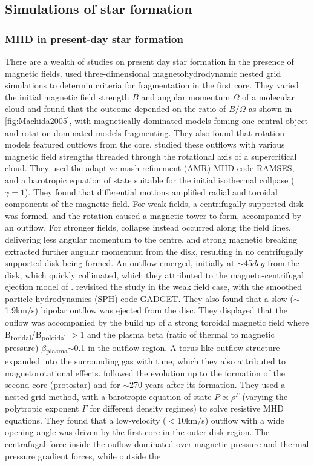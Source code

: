 \documentclass[11pt]{article}
\begin{document}
\subsection{Simulations of star formation}
\subsubsection{MHD in present-day star formation}
\label{sub:MHD_present}

There are a wealth of studies on present day star formation in the presence of magnetic fields. \cite{Machida2005} used three-dimensional magnetohydrodynamic nested grid simulations to determin criteria for fragmentation in the first core. They varied the initial magnetic field strength $B$ and angular momentum $\Omega$ of a molecular cloud and found that the outcome depended on the ratio of $B/\Omega$ as shown in \autoref{fig:Machida2005}, with magnetically dominated models foming one central object and rotation dominated models fragmenting. They also found that rotation models featured outflows from the core. \cite{Hennebelle2008} studied these outflows with various magnetic field strengths threaded  through the rotational axis of a supercritical cloud. They used the adaptive mash refinement (AMR) MHD code RAMSES, and a barotropic equation of state suitable for the initial isothermal collpase ($\gamma =1$). They found that differential motions amplified radial and toroidal components of the magnetic field. For weak fields, a centrifugally supported disk was formed, and the rotation caused a magnetic tower to form, accompanied by an outflow. For stronger fields, collapse instead occurred along the field lines, delivering less angular momentum to the centre, and strong magnetic breaking extracted further angular momentum from the disk, resulting in no centrifugally supported disk being formed. An outflow emerged, initially at $\sim$45$deg$ from the disk, which quickly collimated, which they attributed to the magneto-centrifugal ejection model of \cite{Blandford1982}. \cite{Burzle2011} revisited the study in the weak field case, with the smoothed particle hydrodynamics (SPH) code GADGET.  They also found that a slow ($\sim$1.9km/s) bipolar outflow was ejected from the disc. They displayed that the ouflow was accompanied by the build up of a strong toroidal magnetic field where B\textsubscript{toridal}/B\textsubscript{poloidal} $>$1 and the plasma beta (ratio of thermal to magnetic pressure) $\beta$\textsubscript{plasma}$\sim$0.1 in the outflow region. A torus-like outflow structure  expanded into the surrounding gas with time, which they also attributed to magnetorotational effects. \cite{Machida2014}  followed the evolution up to the formation of the second core (protostar) and for $\sim$270 years after its formation. They used a nested grid method, with a barotropic equation of state $P\propto\rho^{\Gamma}$ (varying the polytropic exponent $\Gamma$ for different density regimes) to solve resistive MHD equations. They found that a low-velocity ($<$10km/s) outflow with a wide opening angle was driven by the first core in the outer disk region. The centrafugal force inside the ouflow dominated over magnetic pressure and thermal pressure gradient forces, while outside the 
\end{document}
